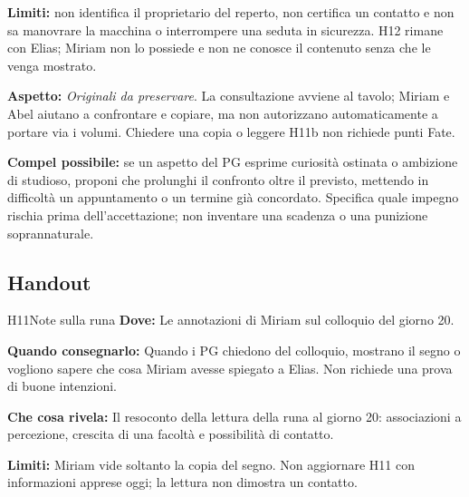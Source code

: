 \documentclass[11pt,a4paper]{article}
\newcommand{\aspect}[1]{\textit{\textcolor{blood}{#1}}}
\begin{document}
\textbf{Limiti:} non identifica il proprietario del reperto, non certifica un contatto e non sa manovrare la macchina o interrompere una seduta in sicurezza. H12 rimane con Elias; Miriam non lo possiede e non ne conosce il contenuto senza che le venga mostrato.

\begin{fatebox}
\textbf{Aspetto:} \aspect{Originali da preservare}. La consultazione avviene al tavolo; Miriam e Abel aiutano a confrontare e copiare, ma non autorizzano automaticamente a portare via i volumi. Chiedere una copia o leggere H11b non richiede punti Fate.

\textbf{Compel possibile:} se un aspetto del PG esprime curiosità ostinata o ambizione di studioso, proponi che prolunghi il confronto oltre il previsto, mettendo in difficoltà un appuntamento o un termine già concordato. Specifica quale impegno rischia prima dell'accettazione; non inventare una scadenza o una punizione soprannaturale.
\end{fatebox}

\subsection{Handout}
\label{nodo-6-handout}
{}
\begin{handoutbox}{H11}{Note sulla runa}
\textbf{Dove:} Le annotazioni di Miriam sul colloquio del giorno 20.

\textbf{Quando consegnarlo:} Quando i PG chiedono del colloquio, mostrano il segno o vogliono sapere che cosa Miriam avesse spiegato a Elias. Non richiede una prova di buone intenzioni.

\textbf{Che cosa rivela:} Il resoconto della lettura della runa al giorno 20: associazioni a percezione, crescita di una facoltà e possibilità di contatto.

\textbf{Limiti:} Miriam vide soltanto la copia del segno. Non aggiornare H11 con informazioni apprese oggi; la lettura non dimostra un contatto.
\end{handoutbox}
\end{document}
